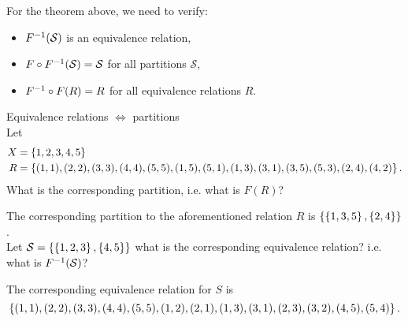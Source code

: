 \documentclass[class=article, crop=false]{standalone}
\begin{document}
  \begin{note}{}
    For the theorem above, we need to verify:
    \begin{itemize}
      \item $F^{-1}(\mathcal{S})$ is an equivalence relation,
      \item $F\circ F^{-1}(\mathcal{S}) = \mathcal{S}$ for all partitions $\mathcal{S}$,
      \item $F^{-1}\circ F(R) = R$ for all equivalence relations $R$.
    \end{itemize}
  \end{note}
  \begin{example}{Equivalence relations $\iff$ partitions}\\
    Let
    \begin{align*}
      X &= \left\{1, 2, 3, 4, 5\right\} \\
      R &= \left\{(1, 1), (2, 2), (3, 3), (4, 4), (5, 5), (1, 5), (5, 1), (1, 3), (3, 1), (3, 5), (5, 3), (2, 4), (4, 2)\right\}.
    \end{align*}
    What is the corresponding partition, i.e. what is $F(R)$? \par
    The corresponding partition to the aforementioned relation $R$ is $\left\{\left\{1,3,5\right\}, \left\{2,4\right\}\right\}$.\\[10pt]
    Let $\mathcal{S} = \left\{\left\{1, 2, 3\right\}, \left\{4, 5\right\}\right\}$ what is the corresponding equivalence relation? i.e. what is $F^{-1}(\mathcal{S})$?\par
    The corresponding equivalence relation for $S$ is
    \[
      \left\{(1, 1), (2, 2), (3, 3), (4, 4), (5, 5), (1, 2), (2, 1), (1, 3), (3, 1), (2, 3), (3, 2), (4, 5), (5, 4)\right\}.
    \]
  \end{example}
\end{document}
